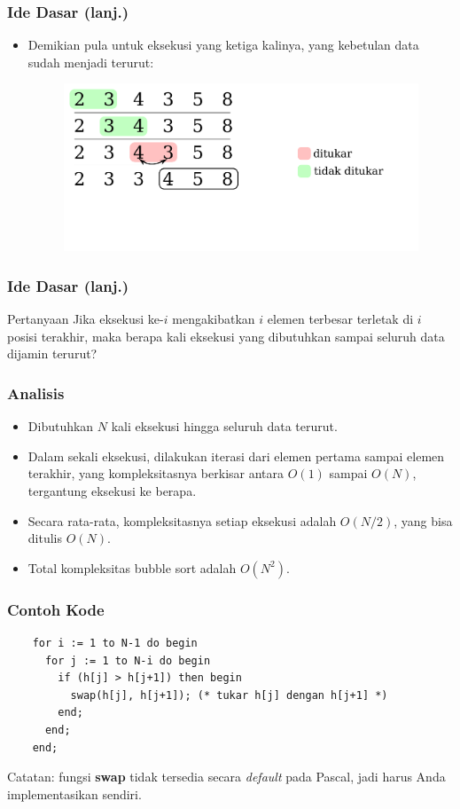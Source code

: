 \begin{frame}
\frametitle{Ide Dasar (lanj.)}
  \begin{itemize}
    \item Demikian pula untuk eksekusi yang ketiga kalinya, yang
    kebetulan data sudah menjadi terurut:
    \begin{figure}
      \includegraphics[width=11cm]{asset/bubble-sort-3.pdf}
    \end{figure}
  \end{itemize}
\end{frame}

\begin{frame}
\frametitle{Ide Dasar (lanj.)}
  \begin{block}{Pertanyaan}
    Jika eksekusi ke-$i$ mengakibatkan $i$ elemen terbesar terletak di $i$
    posisi terakhir, maka berapa kali eksekusi yang dibutuhkan sampai
    seluruh data dijamin terurut?
  \end{block}
\end{frame}

\begin{frame}
\frametitle{Analisis}
  \begin{itemize}
    \item Dibutuhkan $N$ kali eksekusi hingga seluruh data terurut.
    \item Dalam sekali eksekusi, dilakukan iterasi dari elemen pertama
    sampai elemen terakhir, yang kompleksitasnya berkisar antara
    $O(1)$ sampai $O(N)$, tergantung eksekusi ke berapa.
    \item Secara rata-rata, kompleksitasnya setiap eksekusi adalah
    $O(N/2)$, yang bisa ditulis $O(N)$.
    \item Total kompleksitas bubble sort adalah $O(N^2)$.
  \end{itemize}
\end{frame}

\begin{frame}[fragile]
\frametitle{Contoh Kode}
  \begin{lstlisting}
    for i := 1 to N-1 do begin
      for j := 1 to N-i do begin
        if (h[j] > h[j+1]) then begin
          swap(h[j], h[j+1]); (* tukar h[j] dengan h[j+1] *)
        end;
      end;
    end;
  \end{lstlisting}
  Catatan: fungsi \textbf{swap} tidak tersedia secara \textit{default} pada Pascal, jadi harus Anda implementasikan sendiri.
\end{frame}

